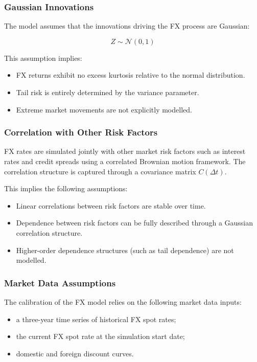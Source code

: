 \subsubsection{Gaussian Innovations}

The model assumes that the innovations driving the FX process are Gaussian:

\begin{equation}
	Z \sim \mathcal{N}(0,1)
\end{equation}

This assumption implies:

\begin{itemize}
	\item FX returns exhibit no excess kurtosis relative to the normal distribution.
	\item Tail risk is entirely determined by the variance parameter.
	\item Extreme market movements are not explicitly modelled.
\end{itemize}

\subsubsection{Correlation with Other Risk Factors}

FX rates are simulated jointly with other market risk factors such as interest rates and credit spreads using a correlated Brownian motion framework. 
The correlation structure is captured through a covariance matrix $C(\Delta t)$.

This implies the following assumptions:

\begin{itemize}
	\item Linear correlations between risk factors are stable over time.
	\item Dependence between risk factors can be fully described through a Gaussian correlation structure.
	\item Higher-order dependence structures (such as tail dependence) are not modelled.
\end{itemize}

\subsubsection{Market Data Assumptions}

The calibration of the FX model relies on the following market data inputs:

\begin{itemize}
	\item a three-year time series of historical FX spot rates;
	\item the current FX spot rate at the simulation start date;
	\item domestic and foreign discount curves.
\end{itemize}

